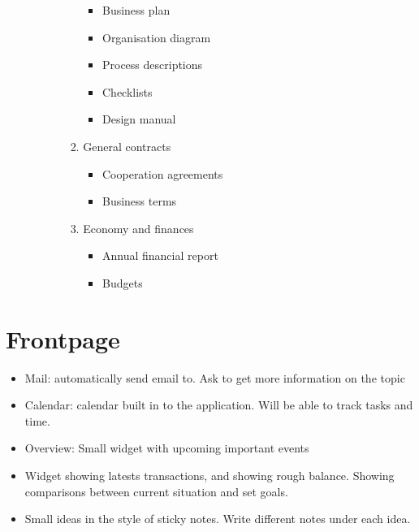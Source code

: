 \begin{enumerate}
\begin{enumerate}
\begin{enumerate}
\begin{enumerate}
\begin{itemize}
                    \item Business plan
                    \item Organisation diagram
                    \item Process descriptions
                    \item Checklists
                    \item Design manual
                \end{itemize}
                \item General contracts
                \begin{itemize}
                    \item Cooperation agreements
                    \item Business terms
                \end{itemize}
                \item Economy and finances
                \begin{itemize}
                    \item Annual financial report
                    \item Budgets
                \end{itemize}
            \end{enumerate}
        \end{enumerate}
    \end{enumerate}
\end{enumerate}

\section{Frontpage}
\begin{itemize}
  \item Mail: automatically send email to. Ask to get more information on the topic
  \item Calendar: calendar built in to the application. Will be able to track tasks and time.
  \item Overview: Small widget with upcoming important events
  \item Widget showing latests transactions, and showing rough balance. Showing comparisons between current situation and set goals.
  \item Small ideas in the style of sticky notes. Write different notes under each idea.
\end{itemize}

